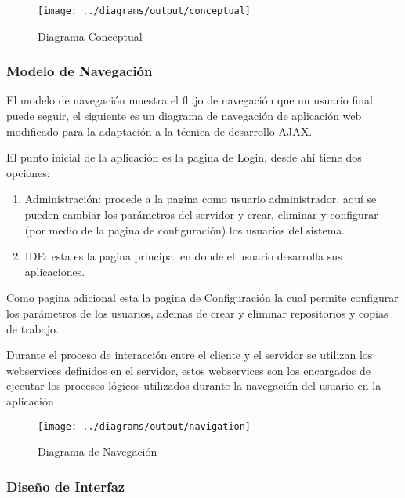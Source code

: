 \begin{landscape}
\begin{figure}
 \centering
 \texttt{[image: ../diagrams/output/conceptual]}
 \caption{Diagrama Conceptual}
 \label{diagrama:conceptual}
\end{figure}
\end{landscape}


\subsubsection{Modelo de Navegación}

El modelo de navegación muestra el flujo de navegación que un usuario final puede seguir, el siguiente es un diagrama de navegación de aplicación web modificado para la adaptación a la técnica de desarrollo AJAX.

El punto inicial de la aplicación es la pagina de Login, desde ahí tiene dos opciones:

\begin{enumerate}
	
	\item Administración: procede a la pagina como usuario administrador, aquí se pueden cambiar los parámetros del servidor y crear, eliminar y configurar (por medio de la pagina de configuración) los usuarios del sistema.
	
	\item IDE: esta es la pagina principal en donde el usuario desarrolla sus aplicaciones.
	
\end{enumerate}

Como pagina adicional esta la pagina de Configuración la cual permite configurar los parámetros de los usuarios, ademas de crear y eliminar repositorios y copias de trabajo.

Durante el proceso de interacción entre el cliente y el servidor se utilizan los webservices definidos en el servidor, estos webservices son los encargados de ejecutar los procesos lógicos utilizados durante la navegación del usuario en la aplicación

\begin{landscape}
\begin{figure}
 \centering
 \texttt{[image: ../diagrams/output/navigation]}
 \caption{Diagrama de Navegación}
 \label{diagrama:navegación}
\end{figure}
\end{landscape}


\subsubsection{Diseño de Interfaz}

